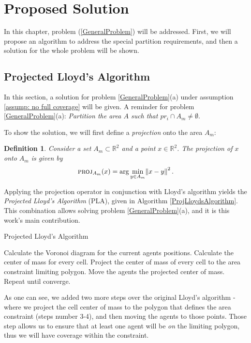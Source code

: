 \documentclass{iacas}
\newtheorem{definition}{Definition}
\begin{document}
\section{Proposed Solution}

In this chapter, problem (\ref{GeneralProblem}) will be addressed. First, we will propose an algorithm to address the special partition requirements, and then a solution for the whole problem will be shown.

\subsection{Projected Lloyd's Algorithm}
In this section, a solution for problem \ref{GeneralProblem}(a) under assumption \ref{assump: no full coverage} will be given. A reminder for problem \ref{GeneralProblem}(a): 
\emph{Partition the area $A$ such that $pr_i \cap A_m \neq \emptyset$}.

To show the solution, we will first define a \emph{projection} onto the area $A_m$:
\begin{definition}
Consider a set $A_m \subset \mathbb{R}^2$ and a point $x \in \mathbb{R}^2$.  The \emph{projection} of $x$ onto $A_m$ is given by
$$\textsc{proj}_{A_m}(x) = \arg\min_{y \in A_m} \norm{x-y}^2.$$
\label{def:projection operator}
\end{definition}

Applying the projection operator in conjunction with Lloyd's algorithm yields the \emph{Projected Lloyd's Algorithm} (PLA), given in Algorithm \ref{ProjLloydsAlgorithm}. This combination allows solving problem \ref{GeneralProblem}(a), and it is this work's main contribution.%
\begin{algorithm}
\caption{Projected Lloyd's Algorithm}\label{ProjLloydsAlgorithm}
\begin{algorithmic}[1]
\State Calculate the Voronoi diagram for the current agents positions.
\State Calculate the center of mass for every cell.
\State Project the center of mass of every cell to the area constraint limiting polygon.
\State Move the agents the projected center of mass.
\State Repeat until converge.
\end{algorithmic}
\label{algo:PLA}
\end{algorithm}

As one can see, we added two more steps over the original Lloyd's algorithm - where we project the cell center of mass to the polygon that defines the area constraint (steps number 3-4), and then moving the agents to those points. Those step allows us to ensure that at least one agent will be \emph{on} the limiting polygon, thus we will have coverage within the constraint.
\end{document}
